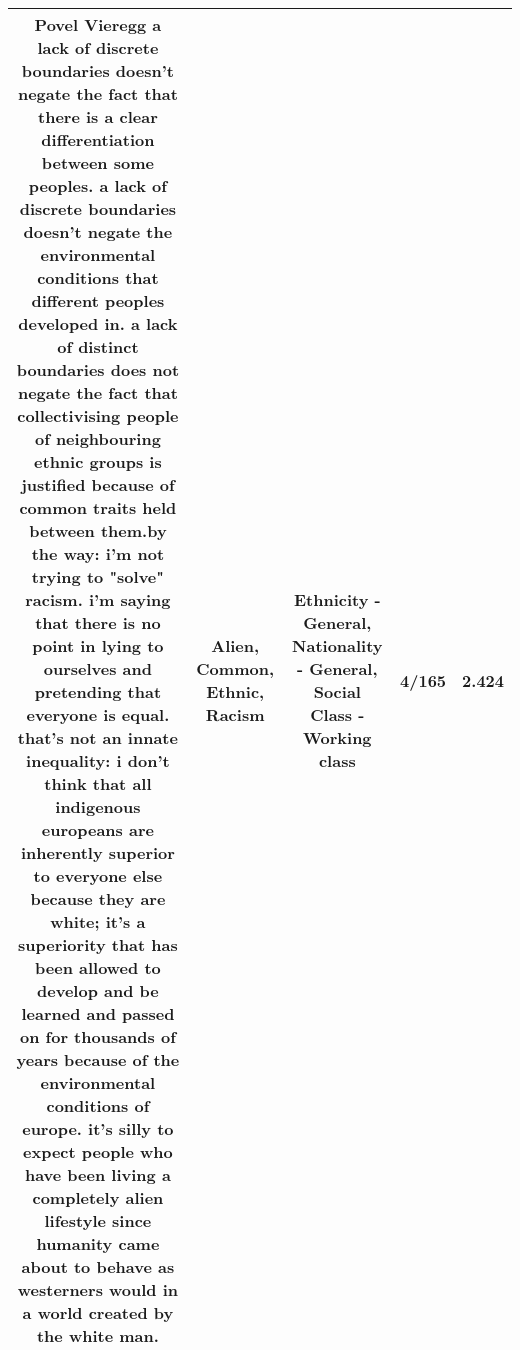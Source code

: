 \documentclass[11pt]{article}
\newlength\mylength
\begin{document}
\begin{center}
\begin{longtable}{|C{.65\mylength}|C{.30\mylength}|C{.12\mylength}|C{.12\mylength}|C{.12\mylength}|}
  \small Povel Vieregg a lack of discrete boundaries doesn't negate the fact that there is a clear differentiation between some peoples. a lack of discrete boundaries doesn't negate the environmental conditions that different peoples developed in. a lack of distinct boundaries does not negate the fact that collectivising people of neighbouring \textbf{ethnic} groups is justified because of \textbf{common} traits held between them.by the way: i'm not trying to "solve" \textbf{racism}. i'm saying that there is no point in lying to ourselves and pretending that everyone is equal. that's not an innate inequality: i don't think that all indigenous europeans are inherently superior to everyone else because they are white; it's a superiority that has been allowed to develop and be learned and passed on for thousands of years because of the environmental conditions of europe. it's silly to expect people who have been living a completely \textbf{alien} lifestyle since humanity came about to behave as westerners would in a world created by the white man.\normalsize   & Alien, Common, Ethnic, Racism & Ethnicity - General, Nationality - General, Social Class - Working class & 4/165 & 2.424 \\  \hline

\end{longtable}
\end{center}
\end{document}
